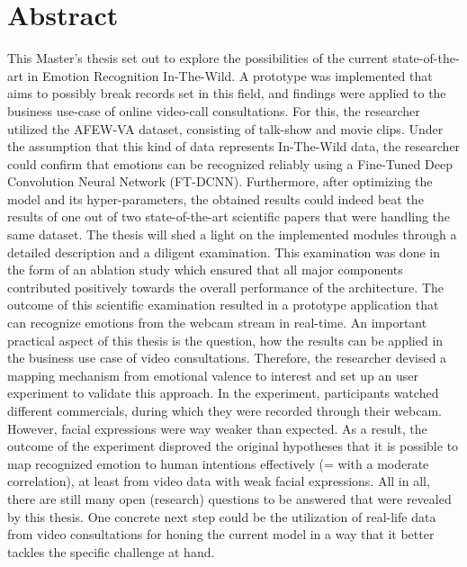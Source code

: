 \documentclass[11pt,a4paper]{scrbook}
\begin{document}
\begin{titlepage}
\end{titlepage}

\restoregeometry



\chapter{Abstract}
This Master's thesis set out to explore the possibilities of the current state-of-the-art in Emotion Recognition In-The-Wild. A prototype was implemented that aims to possibly break records set in this field, and findings were applied to the business use-case of online video-call consultations.
\newline\newline
For this, the researcher utilized the AFEW-VA dataset, consisting of talk-show and movie clips. Under the assumption that this kind of data represents In-The-Wild data, the researcher could confirm that emotions can be recognized reliably using a Fine-Tuned Deep Convolution Neural Network (FT-DCNN). Furthermore, after optimizing the model and its hyper-parameters, the obtained results could indeed beat the results of one out of two state-of-the-art scientific papers that were handling the same dataset.
\newline\newline
The thesis will shed a light on the implemented modules through a detailed description and a diligent examination. This examination was done in the form of an ablation study which ensured that all major components contributed positively towards the overall performance of the architecture. The outcome of this scientific examination resulted in a prototype application that can recognize emotions from the webcam stream in real-time.
\newline\newline
An important practical aspect of this thesis is the question, how the results can be applied in the business use case of video consultations. Therefore, the researcher devised a mapping mechanism from emotional valence to interest and set up an user experiment to validate this approach. In the experiment, participants watched different commercials, during which they were recorded through their webcam. However, facial expressions were way weaker than expected. As a result, the outcome of the experiment disproved the original hypotheses that it is possible to map recognized emotion to human intentions effectively (= with a moderate correlation), at least from video data with weak facial expressions.
\newline\newline
All in all, there are still many open (research) questions to be answered that were revealed by this thesis. One concrete next step could be the utilization of real-life data from video consultations for honing the current model in a way that it better tackles the specific challenge at hand.
\end{document}
